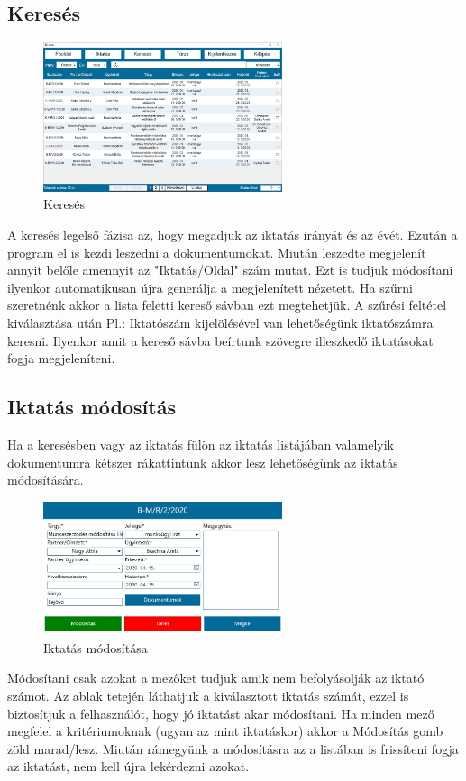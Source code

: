 \documentclass[
]{thesis-ekf}
\theoremstyle{definition}
\theoremstyle{remark}
\begin{document}
\subsection{Keresés}
\begin{figure}[h!]
	\centering
	\includegraphics[width=7cm]{dokukepek/ckereses}
	\caption{Keresés}
	\label{fig:ckereses}
\end{figure}
A keresés legelső fázisa az, hogy megadjuk az iktatás irányát és az évét. Ezután a program el is kezdi leszedni a dokumentumokat. Miután leszedte megjelenít annyit belőle amennyit az "Iktatás/Oldal" szám mutat. Ezt is tudjuk módosítani ilyenkor automatikusan újra generálja a megjelenített nézetett. Ha szűrni szeretnénk akkor a lista feletti kereső sávban ezt megtehetjük. A szűrési feltétel kiválasztása után Pl.: Iktatószám kijelölésével van lehetőségünk iktatószámra keresni. Ilyenkor amit a kereső sávba beírtunk szövegre illeszkedő iktatásokat fogja megjeleníteni.
\subsection{Iktatás módosítás}
Ha a keresésben vagy az iktatás fülön az iktatás listájában valamelyik dokumentumra kétszer rákattintunk akkor lesz lehetőségünk az iktatás módosítására.
\begin{figure}[h!]
	\centering
	\includegraphics[width=7cm]{dokukepek/ciktatmod}
	\caption{Iktatás módosítása}
	\label{fig:ciktatmod}
\end{figure}
Módosítani csak azokat a mezőket tudjuk amik nem befolyásolják az iktató számot. Az ablak tetején láthatjuk a kiválasztott iktatás számát, ezzel is biztosítjuk a felhasználót, hogy jó iktatást akar módosítani. Ha minden mező megfelel a kritériumoknak (ugyan az mint iktatáskor) akkor a Módosítás gomb zöld marad/lesz. Miután rámegyünk a módosításra az a listában is frissíteni fogja az iktatást, nem kell újra lekérdezni azokat.
\end{document}
